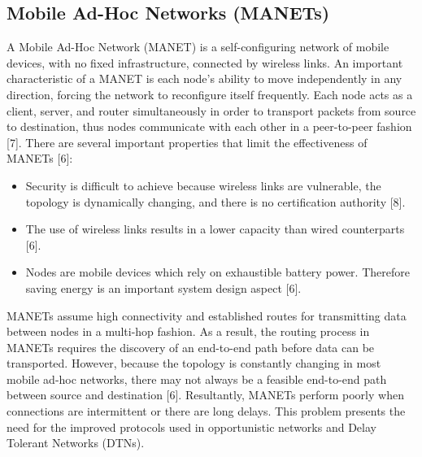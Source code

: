 \documentclass{article}
\begin{document}
\subsection{Mobile Ad-Hoc Networks (MANETs)}
A Mobile Ad-Hoc Network (MANET) is a self-configuring network of mobile devices, with no fixed infrastructure, connected by wireless links. An important characteristic of a MANET is each node's ability to move independently in any direction, forcing the network to reconfigure itself frequently. Each node acts as a client, server, and router simultaneously in order to transport packets from source to destination, thus nodes communicate with each other in a peer-to-peer fashion [7]. There are several important properties that limit the effectiveness of MANETs [6]:
\begin{itemize}
	\item Security is difficult to achieve because wireless links are vulnerable, the topology is dynamically changing, and there is no certification authority [8].
	\item The use of wireless links results in a lower capacity than wired counterparts [6].
	\item Nodes are mobile devices which rely on exhaustible battery power. Therefore saving energy is an important system design aspect [6].
\end{itemize}
MANETs assume high connectivity and established routes for transmitting data between nodes in a multi-hop fashion. As a result, the routing process in MANETs requires the discovery of an end-to-end path before data can be transported. However, because the topology is constantly changing in most mobile ad-hoc networks, there may not always be a feasible end-to-end path between source and destination [6]. Resultantly, MANETs perform poorly when connections are intermittent or there are long delays. This problem presents the need for the improved protocols used in opportunistic networks and Delay Tolerant Networks (DTNs).
\end{document}
